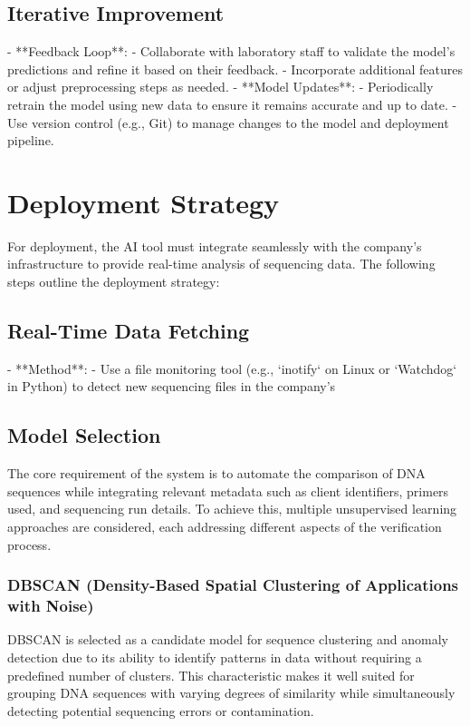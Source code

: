 \subsection{Iterative Improvement}
- **Feedback Loop**:
  - Collaborate with laboratory staff to validate the model's predictions and refine it based on their feedback.
  - Incorporate additional features or adjust preprocessing steps as needed.
- **Model Updates**:
  - Periodically retrain the model using new data to ensure it remains accurate and up to date.
  - Use version control (e.g., Git) to manage changes to the model and deployment pipeline.

\section{Deployment Strategy}
\label{sec:deployment}

For deployment, the AI tool must integrate seamlessly with the company's infrastructure to provide real-time analysis of sequencing data. The following steps outline the deployment strategy:

\subsection{Real-Time Data Fetching}
- **Method**:
  - Use a file monitoring tool (e.g., `inotify` on Linux or `Watchdog` in Python) to detect new sequencing files in the company’s


  \subsection{Model Selection}
  The core requirement of the system is to automate the comparison of DNA sequences while integrating relevant metadata such as client identifiers, primers used, and sequencing run details. To achieve this, multiple unsupervised learning approaches are considered, each addressing different aspects of the verification process.
  
  \subsubsection{DBSCAN (Density-Based Spatial Clustering of Applications with Noise)}
  DBSCAN is selected as a candidate model for sequence clustering and anomaly detection due to its ability to identify patterns in data without requiring a predefined number of clusters. This characteristic makes it well suited for grouping DNA sequences with varying degrees of similarity while simultaneously detecting potential sequencing errors or contamination.
  
